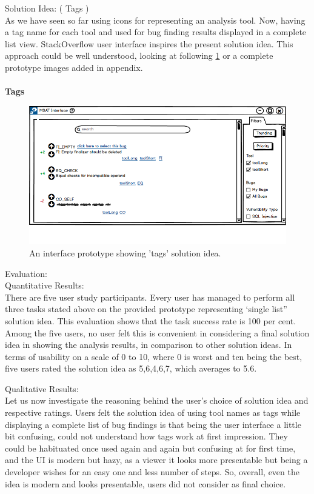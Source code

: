 Solution Idea: ( Tags ) \\

As we have seen so far using icons for representing an analysis tool. Now, having a tag name for each tool and used for bug finding results displayed in a complete list view. StackOverflow user interface inspires the present solution idea. This approach could be well understood, looking at following \ref{fig:S11_tags} or a complete prototype images added in appendix. 
\\ \\

\textbf{Tags}
\begin{figure}[hbt!]
	\centering
	\includegraphics[width=\linewidth]{figures/solution_ideas_snaps/S11_tags}
	\caption{An interface prototype showing 'tags' solution idea.}
	\label{fig:S11_tags}
\end{figure}

Evaluation: \\

Quantitative Results: \\

There are five user study participants. Every user has managed to perform all three tasks stated above on the provided prototype representing ‘single list” solution idea. This evaluation shows that the task success rate is 100 per cent.
Among the five users, no user felt this is convenient in considering a final solution idea in showing the analysis results, in comparison to other solution ideas.  In terms of usability on a scale of 0 to 10, where 0 is worst and ten being the best, five users rated the solution idea as 5,6,4,6,7, which averages to 5.6. 

Qualitative Results: \\

Let us now investigate the reasoning behind the user’s choice of solution idea and respective ratings. Users felt the solution idea of using tool names as tags while displaying a complete list of bug findings is that being the user interface a little bit confusing, could not understand how tags work at first impression. They could be habituated once used again and again but confusing at for first time, and the UI is modern but hazy, as a viewer it looks more presentable but being a developer wishes for an easy one and less number of steps. So, overall, even the idea is modern and looks presentable, users did not consider as final choice. \\ \\


